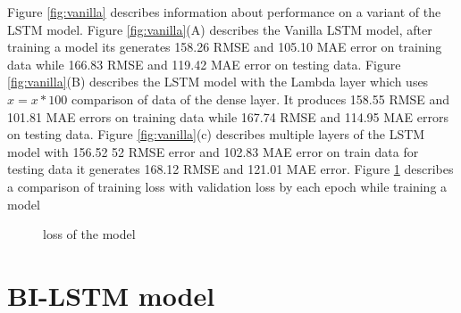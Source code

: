 Figure \ref{fig:vanilla} describes information about performance on a variant of the LSTM model. Figure \ref{fig:vanilla}(A) describes the Vanilla LSTM model, after training a model its generates 158.26 RMSE and 105.10 MAE error on training data while 166.83 RMSE and 119.42 MAE error on testing data. Figure \ref{fig:vanilla}(B) describes the LSTM model with the Lambda layer which uses $x=x*100$ comparison of data of the dense layer. It produces 158.55 RMSE and 101.81 MAE errors on training data while 167.74 RMSE and 114.95 MAE errors on testing data. Figure \ref{fig:vanilla}(c) describes multiple layers of the LSTM  model with 156.52 52 RMSE error and 102.83 MAE error on train data for testing data it generates 168.12 RMSE and 121.01 MAE error. Figure \ref{fig:vanillaloss} describes a comparison of training loss with validation loss by each epoch while training a model


\begin{figure}[htp]

\qquad
{}
\center
{}
\caption{loss of  the model }
\label{fig:vanillaloss}
\end{figure}
\section{BI-LSTM model}

